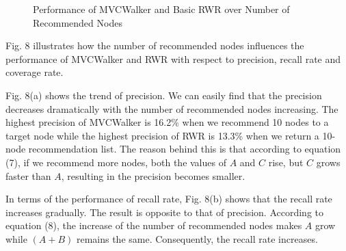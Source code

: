 \documentclass[10pt,journal,compsoc]{IEEEtran}
\begin{document}
\begin{figure}
\centering
{}
\caption{Performance of MVCWalker and Basic RWR over Number of Recommended Nodes}
\label{fig:8}       %
\end{figure}
Fig. 8 illustrates how the number of recommended nodes influences the performance of MVCWalker and RWR with respect to precision, recall rate and coverage rate.

Fig. 8(a) shows the trend of precision. We can easily find that the precision decreases dramatically with the number of recommended nodes increasing. The highest precision of MVCWalker is 16.2\% when we recommend 10 nodes to a target node while the highest precision of RWR is 13.3\% when we return a 10-node recommendation list. The reason behind this is that according to equation (7), if we recommend more nodes, both the values of $A$ and $C$ rise, but $C$ grows faster than $A$, resulting in the precision becomes smaller.

In terms of the performance of recall rate, Fig. 8(b) shows that the recall rate increases gradually. The result is opposite to that of precision. According to equation (8), the increase of the number of recommended nodes makes $A$ grow while $(A+B)$ remains the same. Consequently, the recall rate increases.
\end{document}
